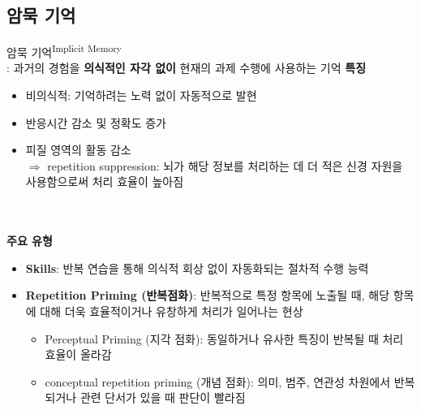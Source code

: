 \documentclass{beamer}
\begin{document}
\subsection{암묵 기억}
\begin{frame}{암묵 기억\textsuperscript{Implicit Memory}\\\normalsize : 과거의 경험을 \textbf{의식적인 자각 없이} 현재의 과제 수행에 사용하는 기억}
  \textbf{특징}
  \vspace{-0.5em}
  \begin{itemize}
    \item 비의식적: 기억하려는 노력 없이 자동적으로 발현
    \item 반응시간 감소 및 정확도 증가
    \item 피질 영역의 활동 감소\\
    $\Rightarrow$ repetition suppression: 뇌가 해당 정보를 처리하는 데 더 적은 신경 자원을 사용함으로써 처리 효율이 높아짐
  \end{itemize}\\~\\
  \textbf{주요 유형}
  \vspace{-0.5em}
  \begin{itemize}
    \item \textbf{Skills}: 반복 연습을 통해 의식적 회상 없이 자동화되는 절차적 수행 능력
    \item \textbf{Repetition Priming (반복점화)}: 반복적으로 특정 항목에 노출될 때, 해당 항목에 대해 더욱 효율적이거나 유창하게  처리가 일어나는 현상
      \begin{itemize}
        \item Perceptual Priming (지각 점화): 동일하거나 유사한 특징이 반복될 때 처리 효율이 올라감
        \item conceptual repetition priming (개념 점화): 의미, 범주, 연관성 차원에서 반복되거나 관련 단서가 있을 때 판단이 빨라짐
      \end{itemize}
  \end{itemize}
\end{frame}
\end{document}
